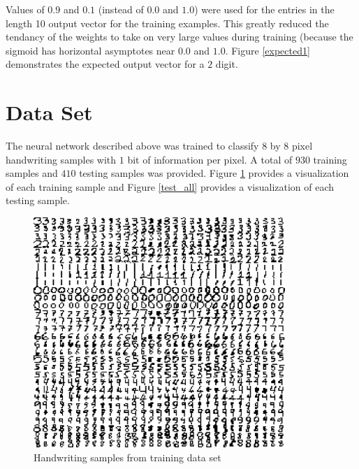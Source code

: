 \documentclass{article}
\begin{document}
Values of \(0.9\) and \(0.1\) (instead of \(0.0\) and \(1.0\)) were used for the entries in the length 10 output vector for the training examples. This greatly reduced the tendancy of the weights to take on very large values during training (because the sigmoid has horizontal asymptotes near \(0.0\) and \(1.0\). Figure \ref{expected1} demonstrates the expected output vector for a \(2\) digit.

\section{Data Set}\label{Dataset}

The neural network described above was trained to classify \(8\) by \(8\) pixel handwriting samples with \(1\) bit of information per pixel. A total of \(930\) training samples and \(410\) testing samples was provided. Figure \ref{train_all} provides a visualization of each training sample and Figure \ref{test_all} provides a visualization of each testing sample.

\begin{figure}
\centering
\includegraphics[width=0.85\textwidth]{data/visualization/all_training_data.png}
\caption{Handwriting samples from training data set}
\label{train_all}
\end{figure}
\end{document}
